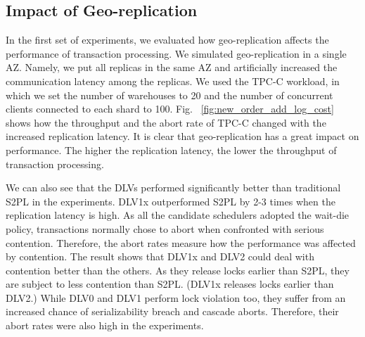 \documentclass[conference]{IEEEtran}
\begin{document}
\subsection{Impact of Geo-replication}

In the first set of experiments, we evaluated how geo-replication affects the performance of transaction processing.
We simulated geo-replication in a single AZ. 
Namely, we put all replicas in the same AZ and artificially increased the communication latency among the replicas. 
We used the TPC-C workload, in which we set the number of warehouses to 20 and the number of concurrent clients connected to each shard to 100.
Fig. ~\ref{fig:new_order_add_log_cost} shows how the throughput and the abort rate of TPC-C changed with the increased replication latency.
It is clear that geo-replication has a great impact on performance. The higher the replication latency, the lower the throughput of transaction processing.

We can also see that the DLVs performed significantly better than traditional S2PL in the experiments.
DLV1x outperformed S2PL by 2-3 times when the replication latency is high.
As all the candidate schedulers adopted the wait-die policy, transactions normally chose to abort when confronted with serious contention.
Therefore, the abort rates measure how the performance was affected by contention.
The result shows that DLV1x and DLV2 could deal with contention better than the others.
As they release locks earlier than S2PL, they are subject to less contention than S2PL. (DLV1x releases locks earlier than DLV2.) 
While DLV0 and DLV1 perform lock violation too, they suffer from an increased chance of serializability breach and cascade aborts.
Therefore, their abort rates were also high in the experiments.
\end{document}
